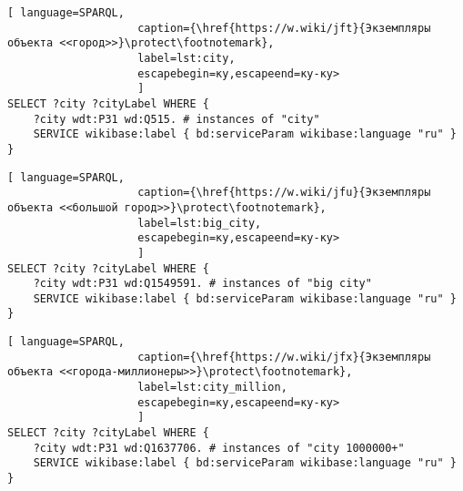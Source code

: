 
\begin{lstlisting}[ language=SPARQL, 
                    caption={\href{https://w.wiki/jft}{Экземпляры объекта <<город>>}\protect\footnotemark},
                    label=lst:city, 
                    escapebegin=ку,escapeend=ку-ку>
                    ]
SELECT ?city ?cityLabel WHERE {
	?city wdt:P31 wd:Q515. # instances of "city"
	SERVICE wikibase:label { bd:serviceParam wikibase:language "ru" }
}
\end{lstlisting}


\begin{lstlisting}[ language=SPARQL, 
                    caption={\href{https://w.wiki/jfu}{Экземпляры объекта <<большой город>>}\protect\footnotemark},
                    label=lst:big_city, 
                    escapebegin=ку,escapeend=ку-ку>
                    ]
SELECT ?city ?cityLabel WHERE {
	?city wdt:P31 wd:Q1549591. # instances of "big city"    
	SERVICE wikibase:label { bd:serviceParam wikibase:language "ru" }
}
\end{lstlisting}

\begin{lstlisting}[ language=SPARQL, 
                    caption={\href{https://w.wiki/jfx}{Экземпляры объекта <<города-миллионеры>>}\protect\footnotemark},
                    label=lst:city_million, 
                    escapebegin=ку,escapeend=ку-ку>
                    ]
SELECT ?city ?cityLabel WHERE {
	?city wdt:P31 wd:Q1637706. # instances of "city 1000000+" 
	SERVICE wikibase:label { bd:serviceParam wikibase:language "ru" }
}
\end{lstlisting}

